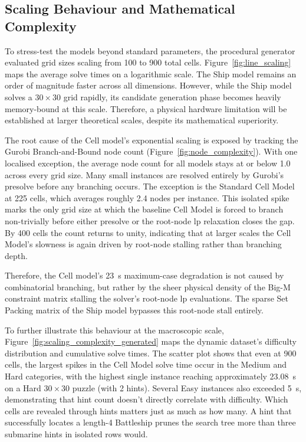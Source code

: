 \subsection{Scaling Behaviour and Mathematical Complexity}\label{subsec:scaling-behaviour}
To stress-test the models beyond standard parameters, the procedural generator evaluated grid sizes scaling from 100 to 900 total cells. Figure~\ref{fig:line_scaling} maps the average solve times on a logarithmic scale. The Ship model remains an order of magnitude faster across all dimensions. However, while the Ship model solves a $30 \times 30$ grid rapidly, its candidate generation phase becomes heavily memory-bound at this scale. Therefore, a physical hardware limitation will be established at larger theoretical scales, despite its mathematical superiority.

The root cause of the Cell model's exponential scaling is exposed by tracking the Gurobi Branch-and-Bound node count (Figure~\ref{fig:node_complexity}). With one localised exception, the average node count for all models stays at or below 1.0 across every grid size. Many small instances are resolved entirely by Gurobi's presolve before any branching occurs. The exception is the Standard Cell Model at 225 cells, which averages roughly 2.4 nodes per instance. This isolated spike marks the only grid size at which the baseline Cell Model is forced to branch non-trivially before either presolve or the root-node \gls{lp} relaxation closes the gap. By 400 cells the count returns to unity, indicating that at larger scales the Cell Model's slowness is again driven by root-node stalling rather than branching depth.

Therefore, the Cell model's \SI{23}{\second} maximum-case degradation is not caused by combinatorial branching, but rather by the sheer physical density of the Big-M constraint matrix stalling the solver's root-node \gls{lp} evaluations. The sparse Set Packing matrix of the Ship model bypasses this root-node stall entirely.

To further illustrate this behaviour at the macroscopic scale, Figure~\ref{fig:scaling_complexity_generated} maps the dynamic dataset's difficulty distribution and cumulative solve times. The scatter plot shows that even at 900 cells, the largest spikes in the Cell Model solve time occur in the Medium and Hard categories, with the highest single instance reaching approximately \SI{23.08}{\second} on a Hard $30 \times 30$ puzzle (with 2 hints). Several Easy instances also exceeded \SI{5}{\second}, demonstrating that hint count doesn't directly correlate with difficulty. Which cells are revealed through hints matters just as much as how many. A hint that successfully locates a length-4 Battleship prunes the search tree more than three submarine hints in isolated rows would.

